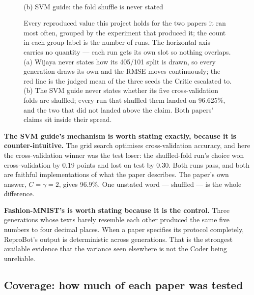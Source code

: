 \documentclass[10pt,twocolumn]{article}
\begin{document}
\begin{figure}[tbp]
\begin{minipage}[t]{0.49\linewidth}
{}\\[-1pt]
{\small (b) SVM guide: the fold shuffle is never stated}
\end{minipage}
\caption{Every reproduced value this project holds for the two papers it ran most often, grouped
by the experiment that produced it; the count in each group label is the number of runs. The
horizontal axis carries no quantity --- each run gets its own slot so nothing overlaps. (a) Wijaya
never states how its 405/101 split is drawn, so every generation draws its own and the RMSE moves
continuously; the red line is the judged mean of the three seeds the Critic escalated to. (b) The
SVM guide never states whether its five cross-validation folds are shuffled; every run that
shuffled them landed on 96.625\%, and the two that did not landed above the claim. Both papers'
claims sit inside their spread.}
\label{fig:spread}
\end{figure}


\textbf{The SVM guide's mechanism is worth stating exactly, because it is counter-intuitive.}
The grid search optimises cross-validation accuracy, and here the cross-validation winner was the
test loser: the shuffled-fold run's choice won cross-validation by 0.19 points and lost on test by
0.30. Both runs pass, and both are faithful implementations of what the paper describes. The
paper's own answer, $C = \gamma = 2$, gives 96.9\%. One unstated word --- shuffled --- is the whole
difference.

\textbf{Fashion-MNIST's is worth stating because it is the control.} Three generations whose
texts barely resemble each other produced the same five numbers to four decimal places. When a
paper specifies its protocol completely, ReproBot's output is deterministic across generations.
That is the strongest available evidence that the variance seen elsewhere is not the Coder being
unreliable.

\subsection{Coverage: how much of each paper was tested}
\end{document}
